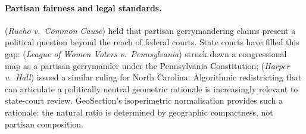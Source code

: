 \paragraph{Partisan fairness and legal standards.}
\citet{rucho2019} (\emph{Rucho v.\ Common Cause}) held that partisan
gerrymandering claims present a political question beyond the reach of
federal courts.
State courts have filled this gap:
\citet{lwv2018pa} (\emph{League of Women Voters v.\ Pennsylvania}) struck down
a congressional map as a partisan gerrymander under the Pennsylvania Constitution;
\citet{harper2022nc} (\emph{Harper v.\ Hall}) issued a similar ruling for
North Carolina.
Algorithmic redistricting that can articulate a politically neutral geometric
rationale is increasingly relevant to state-court review.
GeoSection's isoperimetric normalisation provides such a rationale:
the natural ratio is determined by geographic compactness, not partisan
composition.
